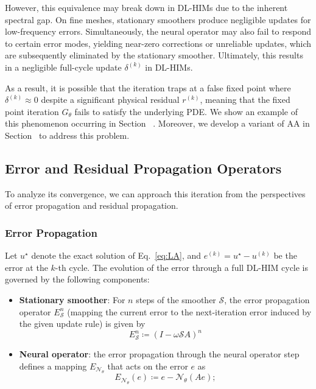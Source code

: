 \documentclass[11pt]{article}
\begin{document}
However, this equivalence may break down in DL-HIMs due to the inherent spectral gap. On fine meshes, stationary smoothers produce negligible updates for low-frequency errors. Simultaneously, the neural operator may also fail to respond to certain error modes, yielding near-zero corrections or unreliable updates, which are subsequently eliminated by the stationary smoother. Ultimately, this results in a negligible full-cycle update $\delta^{(k)}$ in DL-HIMs.

As a result, it is possible that the iteration traps at a false fixed point where $\delta^{(k)} \approx 0$ despite a significant physical residual $r^{(k)}$, meaning that the fixed point iteration $G_\theta$ fails to satisfy the underlying PDE. We show an example of this phenomenon occurring in Section~ . Moreover, we develop a variant of AA in Section~  to address this problem.

\subsection{Error and Residual Propagation Operators}
To analyze its convergence, we can approach this iteration from the perspectives of error propagation and residual propagation.

\subsubsection{Error Propagation}
Let $u^\star$ denote the exact solution of Eq.~\eqref{eq:LA}, and $e^{(k)} = u^\star - u^{(k)}$ be the error at the $k$-th cycle. The evolution of the error through a full DL-HIM cycle is governed by the following components:

\begin{itemize}
    \item \textbf{Stationary smoother}: For $n$ steps of the smoother $\mathcal{S}$, the error propagation operator $E_{\mathcal{S}}^n$ (mapping the current error to the next-iteration error induced by the given update rule) is given by
          \begin{equation}
              E_{\mathcal{S}}^n \coloneqq (I - \omega \mathcal{S}A)^n
          \end{equation}

    \item \textbf{Neural operator}: the error propagation through the neural operator step defines a mapping $E_{\mathcal{N}_\theta}$ that acts on the error $e$ as
          \begin{equation}
              E_{\mathcal{N}_\theta}(e) \coloneqq e - \mathcal{N}_\theta(A e);
          \end{equation}
\end{itemize}
\end{document}
